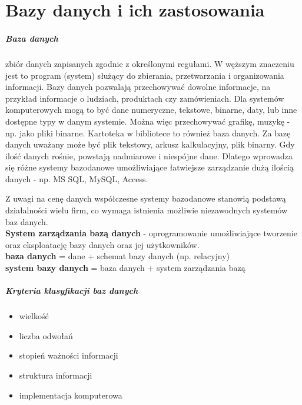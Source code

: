 \documentclass[]{report}
\begin{document}
\chapter{Bazy danych i ich zastosowania}

\paragraph{Baza danych} zbiór danych zapisanych zgodnie z określonymi regułami. W węższym znaczeniu jest to program (system) służący do zbierania, przetwarzania i organizowania informacji. 
Bazy danych pozwalają przechowywać dowolne informacje, na przykład informacje o ludziach, produktach czy zamówieniach. Dla systemów komputerowych mogą to być dane numeryczne, tekstowe, binarne, daty, lub inne dostępne typy w danym systemie. Można więc przechowywać grafikę, muzykę - np. jako pliki binarne. Kartoteka w bibliotece to również baza danych.
 Za bazę danych uważany może być plik tekstowy, arkusz kalkulacyjny, plik binarny. Gdy ilość danych rośnie, powstają nadmiarowe i niespójne dane. Dlatego wprowadza się różne systemy bazodanowe umożliwiające łatwiejsze zarządzanie dużą ilością danych - np. MS SQL, MySQL, Access.
 
Z uwagi na cenę danych współczesne systemy bazodanowe stanowią  podstawą działalności wielu firm, co wymaga istnienia możliwie niezawodnych systemów baz danych. \\
\textbf{System zarządzania bazą danych} - oprogramowanie umożliwiające tworzenie oraz eksploatację bazy danych oraz jej użytkowników. \\
\textbf{baza danych} = dane + schemat bazy danych (np. relacyjny) \\
\textbf{system bazy danych} = baza danych + system zarządzania bazą
\medskip 


\paragraph{Kryteria klasyfikacji baz danych}

\begin{itemize}
\item wielkość
\item liczba odwołań
\item stopień ważności informacji
\item struktura informacji
\item implementacja komputerowa
\end{itemize}
\end{document}
